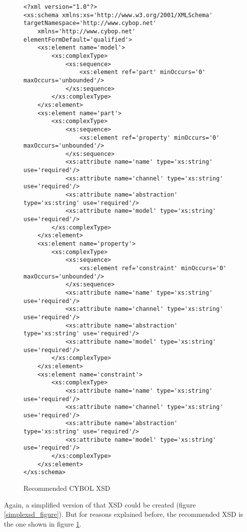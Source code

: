 \begin{figure}[ht]
    \bigskip
    \bigskip
    \begin{scriptsize}
        \begin{verbatim}
<?xml version="1.0"?>
<xs:schema xmlns:xs='http://www.w3.org/2001/XMLSchema' targetNamespace='http://www.cybop.net'
    xmlns='http://www.cybop.net' elementFormDefault='qualified'>
    <xs:element name='model'>
        <xs:complexType>
            <xs:sequence>
                <xs:element ref='part' minOccurs='0' maxOccurs='unbounded'/>
            </xs:sequence>
        </xs:complexType>
    </xs:element>
    <xs:element name='part'>
        <xs:complexType>
            <xs:sequence>
                <xs:element ref='property' minOccurs='0' maxOccurs='unbounded'/>
            </xs:sequence>
            <xs:attribute name='name' type='xs:string' use='required'/>
            <xs:attribute name='channel' type='xs:string' use='required'/>
            <xs:attribute name='abstraction' type='xs:string' use='required'/>
            <xs:attribute name='model' type='xs:string' use='required'/>
        </xs:complexType>
    </xs:element>
    <xs:element name='property'>
        <xs:complexType>
            <xs:sequence>
                <xs:element ref='constraint' minOccurs='0' maxOccurs='unbounded'/>
            </xs:sequence>
            <xs:attribute name='name' type='xs:string' use='required'/>
            <xs:attribute name='channel' type='xs:string' use='required'/>
            <xs:attribute name='abstraction' type='xs:string' use='required'/>
            <xs:attribute name='model' type='xs:string' use='required'/>
        </xs:complexType>
    </xs:element>
    <xs:element name='constraint'>
        <xs:complexType>
            <xs:attribute name='name' type='xs:string' use='required'/>
            <xs:attribute name='channel' type='xs:string' use='required'/>
            <xs:attribute name='abstraction' type='xs:string' use='required'/>
            <xs:attribute name='model' type='xs:string' use='required'/>
        </xs:complexType>
    </xs:element>
</xs:schema>
        \end{verbatim}
    \end{scriptsize}
    \caption{Recommended CYBOL XSD}
    \label{xsd_figure}
\end{figure}

Again, a simplified version of that XSD could be created (figure
\ref{simplexsd_figure}). But for reasons explained before, the recommended XSD
is the one shown in figure \ref{xsd_figure}.
